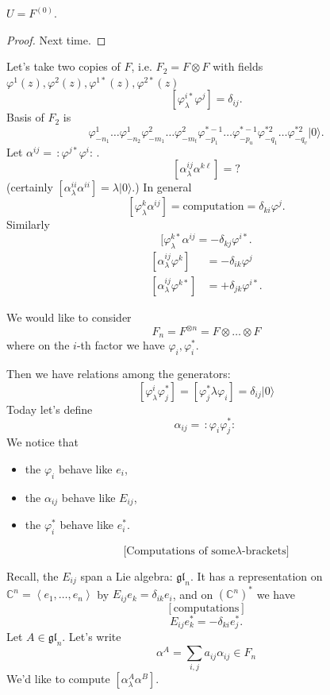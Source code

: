 \begin{proposition}
\label{proposition-U-is-F0}
$U=F^{(0)}$.
\end{proposition}

\begin{proof}
Next time.
\end{proof}

\medskip\noindent
Let's take two copies of $F$,
i.e. $F_2=F \otimes F$
with fields
$\varphi^1(z),\varphi^2(z),\varphi^{1*}(z),
\varphi^{2*}(z)$
$$
[\varphi^{i*}_{\lambda}\varphi^j]=\delta_{ij}
.
$$
Basis of $F_2$ is
$$
\varphi_{-n_1}^1\ldots
\varphi_{-n_2}^1\varphi_{-m_1}^2\ldots
\varphi_{-m_t}^2\varphi^{*-1}_{-p_1}\ldots
\varphi_{-p_u}^{*-1}\varphi_{-q_1}^{*2}
\ldots\varphi_{-q_v}^{*2}|0\rangle.
$$
Let
$\alpha^{ij}=\,:\!\varphi^{j*}\varphi^i\!:\,
$.
$$
[\alpha^{ij}_\lambda \alpha^{k\ell}]=?
$$
(certainly $[\alpha^{ii}_\lambda
\alpha^{ii}]=\lambda |0\rangle$.)
In general
$$
[\varphi^k_\lambda
\alpha^{ij}]=\text{computation}=\delta_{ki}
\varphi^j.
$$
Similarly
$$
[\varphi^{k*}_\lambda
\alpha^{ij}=-\delta_{kj}\varphi^{i*}.
$$
$$
\begin{aligned}
[\alpha^{ij}_\lambda
\varphi^k]&=-\delta_{ik}\varphi^j\\
[\alpha^{ij}_\lambda
\varphi^{k*}]&=+\delta_{j k}\varphi^{i*}.
\end{aligned}
$$

We would like to consider
$$
F_n=F^{\otimes n}=F \otimes \ldots \otimes F
$$
where on the $i$-th factor we have
$\varphi_i,\varphi^*_i$.

Then we have relations among the generators:
$$
[\varphi^i_\lambda \varphi_j^* ]=[\varphi^*
_j\lambda\varphi_i]
=\delta_{ij}|0\rangle
$$
Today let's define
$$
\alpha_{ij}=\,:\!\varphi_i \varphi^*_j\!:\,
$$
We notice that
\begin{itemize}
\item the $\varphi_i$ behave like $e_i$,
\item the $\alpha_{ij}$ behave like $E_{ij}$,
\item the $\varphi_i^*$ behave like $e_i^*$.
\end{itemize}

$$
\text{[Computations of some
$\lambda$-brackets]}
$$

Recall, the $E_{ij}$ span a Lie algebra:
$\mathfrak{gl}_n$.
It has a representation on
$\mathbb{C}^n=\left\langle{}e_1,\ldots,e_n\right\rangle{}$
by $E_{ij}e_k=\delta_{ik}e_i$,
and on $(\mathbb{C}^n)^*$ we have
$$
[\text{computations}]
$$
$$
E_{ij}e_k^* =-\delta_{ki}e_j^*.
$$
Let $A \in \mathfrak{gl}_n$. Let's write
$$
\alpha^A=\sum_{i,j}a_{ij}\alpha_{ij}\in F_n
$$
We'd like to compute $[\alpha^A_\lambda
\alpha^B]$.

